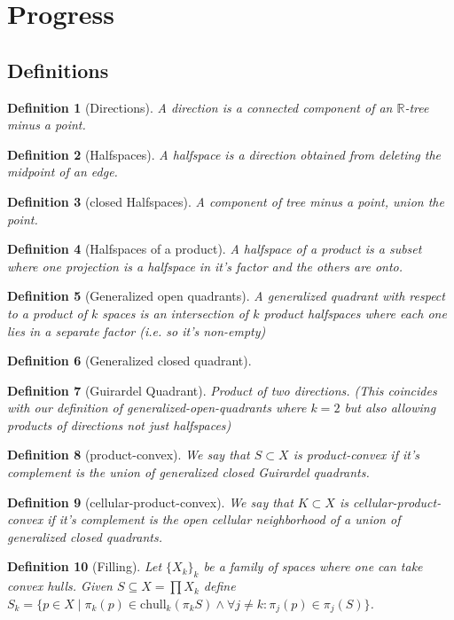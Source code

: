 \documentclass{article}
\theoremstyle{mystyle}
\newtheorem{defn}{Definition}
\theoremstyle{remark}
\begin{document}
\pagebreak
\section{Progress}

\subsection{Definitions}

\begin{defn}[Directions] A direction is a connected component of an \(\mathbb{R}\)-tree minus a point. 
\end{defn}
\begin{defn}[Halfspaces] A halfspace is a direction obtained from deleting the midpoint of an edge.
\end{defn}
\begin{defn}[closed Halfspaces] A component of tree minus a point, union the point.
\end{defn}
\begin{defn}[Halfspaces of a product] A halfspace of a product is a subset where one projection is a halfspace in it's factor and the others are onto.
\end{defn}
\begin{defn}[Generalized open quadrants] A generalized quadrant with respect to a product of \(k\) spaces is an intersection of \(k\) product halfspaces where each one lies in a separate factor (i.e. so it's non-empty)
\end{defn}
\begin{defn}
    [Generalized closed quadrant]
\end{defn}
\begin{defn}
    [Guirardel Quadrant]
    Product of two directions. (This coincides with our definition of generalized-open-quadrants where \(k=2\) but also allowing products of directions not just halfspaces)
\end{defn}
\begin{defn}[product-convex] We say that \(S\subset X\) is product-convex if it's complement is the union of generalized closed Guirardel quadrants.
\end{defn}
\begin{defn}[cellular-product-convex] We say that \(K \subset X\) is cellular-product-convex if it's complement is the open cellular neighborhood of a union of generalized closed quadrants.
\end{defn}

\begin{defn}
	[Filling]
	Let \(\{X_{k}\}_{k}\) be a family of spaces where one can take convex hulls. Given \(S \subseteq X = \prod X_{k}\) define \(S_{k} = \{p \in X \mid \pi_{k} (p) \in \text{chull}_{k}  (\pi_{k} S)\wedge \forall j\neq k: \pi_{j} (p) \in \pi_{j} (S) \} \).
\end{defn}
\end{document}
